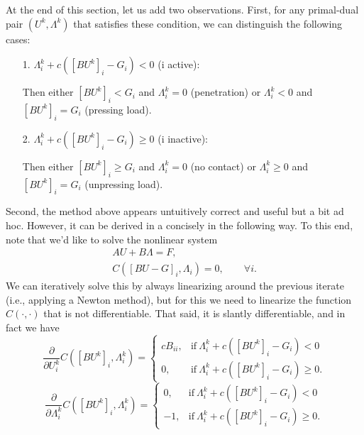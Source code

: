 \documentclass{article}
\begin{document}
At the end of this section, let us add two observations. First,
for any primal-dual pair $(U^k,\Lambda^k)$ that satisfies these
condition, we can distinguish the following cases:
\begin{itemize}
 \item [1.] $\Lambda^k_i + c([BU^k]_i - G_i) < 0$ (i active):

  Then either $[BU^k]_i<G_i$ and $\Lambda^k_i=0$ (penetration) or $\Lambda^k_i<0$ and $[BU^k]_i=G_i$ (pressing load).
 \item [2.] $\Lambda^k_i + c([BU^k]_i - G_i)\geq 0$ (i inactive):

  Then either $[BU^k]_i\geq G_i$ and $\Lambda^k_i=0$ (no contact) or $\Lambda^k_i\geq0$ and $[BU^k]_i=G_i$ (unpressing load).
\end{itemize}

Second, the method above appears untuitively correct and useful but a bit ad
hoc. However, it can be derived in a concisely in the following way. To this
end, note that we'd like to solve the nonlinear system
\begin{eqnarray*}
 &A U + B\Lambda = F,&\\
 &C([BU-G]_i, \Lambda_i) = 0,
\qquad \forall i.&
\end{eqnarray*}
We can iteratively solve this by always linearizing around the previous
iterate (i.e., applying a Newton method), but for this we need to linearize
the function $C(\cdot,\cdot)$ that is not differentiable. That said, it is
slantly differentiable, and in fact we have
\begin{equation*}
 \dfrac{\partial}{\partial U^k_i}C([BU^k]_i,\Lambda^k_i) = \begin{cases}
                                   cB_{ii},& \text{if}\ \Lambda^k_i + c([BU^k]_i - G_i)< 0\\
                                   0,& \text{if}\ \Lambda^k_i + c([BU^k]_i - G_i)\geq 0.
                                  \end{cases}
\end{equation*}
\begin{equation*}
 \dfrac{\partial}{\partial\Lambda^k_i}C([BU^k]_i,\Lambda^k_i) = \begin{cases}
                                   0,& \text{if}\ \Lambda^k_i + c([BU^k]_i - G_i)< 0\\
                                   -1,& \text{if}\ \Lambda^k_i + c([BU^k]_i - G_i)\geq 0.
                                  \end{cases}
\end{equation*}
\end{document}
